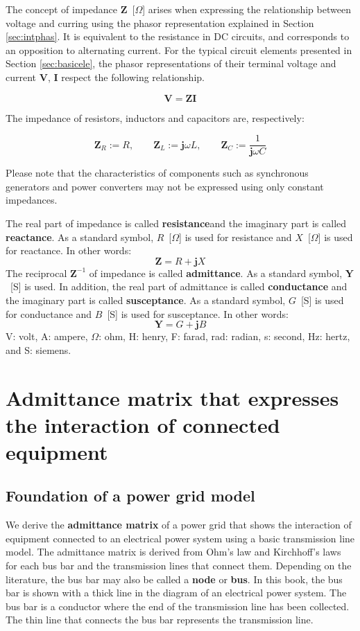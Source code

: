 \documentclass[graybox, envcountchap]{svmult}
\begin{document}
The concept of impedance $\bm{Z}$~[$\Omega$] arises when expressing the
relationship between voltage and curring using the phasor representation
explained in Section \ref{sec:intphas}. It is equivalent to the resistance in DC
circuits, and corresponds to an opposition to alternating current. For the
typical circuit elements presented in Section \ref{sec:basicele}, the phasor
representations of their terminal voltage and current $\bm{V}$, $\bm{I}$ respect
the following relationship.

\begin{equation}
  \bm{V} = \bm{Z}\bm{I}
\end{equation}

The impedance of resistors, inductors and capacitors are, respectively:

\[
  \bm{Z}_{R}:=R,\qquad
  \bm{Z}_{L}:=\bm{j}\omega L,\qquad
  \bm{Z}_{C}:=\frac{1}{\bm{j}\omega C}
\]

Please note that the characteristics of components such as synchronous
generators and power converters may not be expressed using only constant
impedances.

The real part of impedance is called \textbf{resistance}and the imaginary part
is called \textbf{reactance}. As a standard symbol, $R$~[$\Omega$] is used for
resistance and $X$~[$\Omega$] is used for reactance. In other words:
\[
  \bm{Z} = R + \bm{j} X
\]
The reciprocal $\bm{Z}^{-1}$ of impedance is called \textbf{admittance}.
As a standard symbol, $\bm{Y}$~[S] is used.
In addition, the real part of admittance is called \textbf{conductance} and the imaginary part is called \textbf{susceptance}.
As a standard symbol, $G$~[S] is used for conductance and $B$~[S] is used for susceptance.
In other words:
\[
\bm{Y} = G + \bm{j} B
\]
V: volt, A: ampere, $\Omega$: ohm, H: henry, F: farad, rad: radian, s: second, Hz: hertz, and S: siemens.

\section{Admittance matrix that expresses the interaction of connected equipment}\label{sec:transadm}

\subsection{Foundation of a power grid model}


We derive the \textbf{admittance matrix} of a power grid that shows the interaction of equipment connected to an electrical power system using a basic transmission line model.
The admittance matrix is derived from Ohm’s law and Kirchhoff’s laws for each bus bar and the transmission lines that connect them.
Depending on the literature, the bus bar may also be called a \textbf{node} or \textbf{bus}.
In this book, the bus bar is shown with a thick line in the diagram of an electrical power system.
The bus bar is a conductor where the end of the transmission line has been collected. The thin line that connects the bus bar represents the transmission line.
\end{document}

